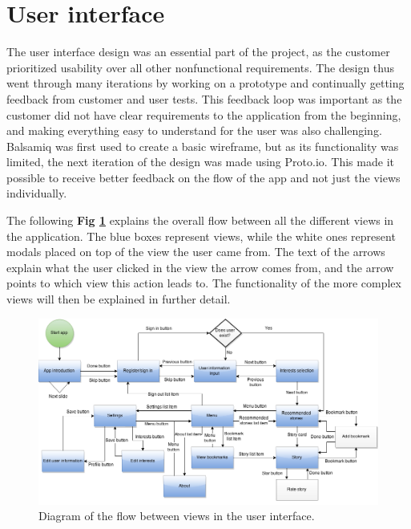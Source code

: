 \section{User interface}

The user interface design was an essential part of the project, as the customer prioritized usability over all other nonfunctional requirements. The design thus went through many iterations by working on a prototype and continually getting feedback from customer and user tests. This feedback loop was important as the customer did not have clear requirements to the application from the beginning, and making everything easy to understand for the user was also challenging.  Balsamiq was first used to create a basic wireframe, but as its functionality was limited, the next iteration of the design was made using Proto.io. This made it possible to receive better feedback on the flow of the app and not just the views individually. \newline

The following \textbf{Fig \ref{Fig:flow_diagram}} explains the overall flow between all the different views in the application. The blue boxes represent views, while the white ones represent modals placed on top of the view the user came from. The text of the arrows explain what the user clicked in the view the arrow comes from, and the arrow points to which view this action leads to.  The functionality of the more complex views will then be explained in further detail.

\begin{figure}[h!]
	\centering
	\includegraphics[width=\textwidth]{fig/flow_diagram}
	\caption{Diagram of the flow between views in the user interface.}
	\label{Fig:flow_diagram}
\end{figure}

